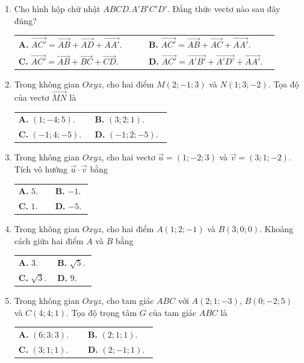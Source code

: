 \documentclass[12pt,a4paper]{article}
\makeatletter
\newcommand{\bonpa}[4]{\par\nobreak\smallskip\nobreak\noindent
\begin{tabular}{@{}p{0.47\linewidth}p{0.47\linewidth}@{}}
\textbf{A.} #1 & \textbf{B.} #2\\[8pt]
\textbf{C.} #3 & \textbf{D.} #4\end{tabular}}
\makeatother
\begin{document}
\begin{enumerate}[start=8]
\item Cho hình hộp chữ nhật $ABCD.A'B'C'D'$. Đẳng thức vectơ nào sau đây đúng?
\bonpa{$\overrightarrow{AC'}=\overrightarrow{AB}+\overrightarrow{AD}+\overrightarrow{AA'}$.}{$\overrightarrow{AC'}=\overrightarrow{AB}+\overrightarrow{AC}+\overrightarrow{AA'}$.}{$\overrightarrow{AC'}=\overrightarrow{AB}+\overrightarrow{BC}+\overrightarrow{CD}$.}{$\overrightarrow{AC'}=\overrightarrow{A'B'}+\overrightarrow{A'D'}+\overrightarrow{AA'}$.}

\item Trong không gian $Oxyz$, cho hai điểm $M(2;-1;3)$ và $N(1;3;-2)$. Tọa độ của vectơ $\overrightarrow{MN}$ là
\bonpa{$(1;-4;5)$.}{$(3;2;1)$.}{$(-1;4;-5)$.}{$(-1;2;-5)$.}

\item Trong không gian $Oxyz$, cho hai vectơ $\vec u=(1;-2;3)$ và $\vec v=(3;1;-2)$. Tích vô hướng $\vec u\cdot\vec v$ bằng
\bonpa{$5$.}{$-1$.}{$1$.}{$-5$.}

\item Trong không gian $Oxyz$, cho hai điểm $A(1;2;-1)$ và $B(3;0;0)$. Khoảng cách giữa hai điểm $A$ và $B$ bằng
\bonpa{$3$.}{$\sqrt5$.}{$\sqrt3$.}{$9$.}

\item Trong không gian $Oxyz$, cho tam giác $ABC$ với $A(2;1;-3)$, $B(0;-2;5)$ và $C(4;4;1)$. Tọa độ trọng tâm $G$ của tam giác $ABC$ là
\bonpa{$(6;3;3)$.}{$(2;1;1)$.}{$(3;1;1)$.}{$(2;-1;1)$.}
\end{enumerate}
\end{document}
